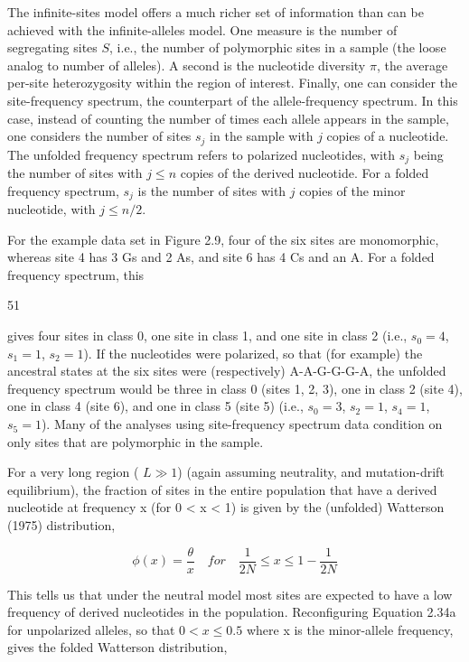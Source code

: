 \documentclass{article}
\begin{document}
The infinite-sites model offers a much richer set of information than can be achieved with the infinite-alleles model. One measure is the number of segregating sites $S$, i.e., the number of polymorphic sites in a sample (the loose analog to number of alleles). A second is the nucleotide diversity $\pi$, the average per-site heterozygosity within the region of interest. Finally, one can consider the site-frequency spectrum, the counterpart of the allele-frequency spectrum. In this case, instead of counting the number of times each allele appears in the sample, one considers the number of sites $s_j$ in the sample with $j$ copies of a nucleotide. The unfolded frequency spectrum refers to polarized nucleotides, with $s_j$ being the number of sites with $j \leq n$ copies of the derived nucleotide. For a folded frequency spectrum, $s_j$ is the number of sites with $j$ copies of the minor nucleotide, with $j \leq n/2$.

For the example data set in Figure 2.9, four of the six sites are monomorphic, whereas site 4 has 3 Gs and 2 As, and site 6 has 4 Cs and an A. For a folded frequency spectrum, this

51

gives four sites in class 0, one site in class 1, and one site in class 2 (i.e.,  $ s_0 = 4 $,  $ s_1 = 1 $,  $ s_2 = 1 $). If the nucleotides were polarized, so that (for example) the ancestral states at the six sites were (respectively) A-A-G-G-G-A, the unfolded frequency spectrum would be three in class 0 (sites 1, 2, 3), one in class 2 (site 4), one in class 4 (site 6), and one in class 5 (site 5) (i.e.,  $ s_0 = 3 $,  $ s_2 = 1 $,  $ s_4 = 1 $,  $ s_5 = 1 $). Many of the analyses using site-frequency spectrum data condition on only sites that are polymorphic in the sample.

For a very long region ( $ L \gg 1 $) (again assuming neutrality, and mutation-drift equilibrium), the fraction of sites in the entire population that have a derived nucleotide at frequency x (for 0 < x < 1) is given by the (unfolded) Watterson (1975) distribution,

\begin{equation}
\phi(x)=\frac{\theta}{x}\quad for\quad\frac{1}{2N}\leq x\leq1-\frac{1}{2N}
\tag{2.34a}
\label{eq:2_34a}
\end{equation}

This tells us that under the neutral model most sites are expected to have a low frequency of derived nucleotides in the population. Reconfiguring Equation 2.34a for unpolarized alleles, so that  $ 0 < x \leq 0.5 $ where x is the minor-allele frequency, gives the folded Watterson distribution,
\end{document}
